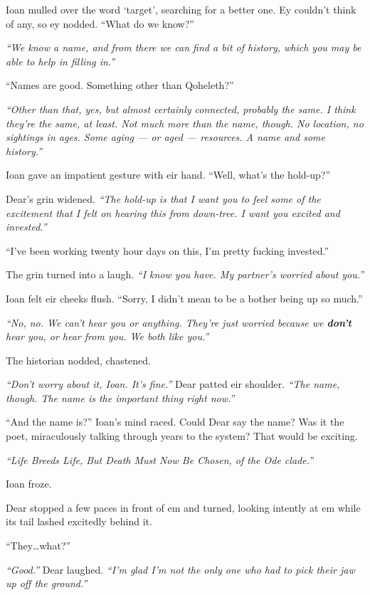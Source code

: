 Ioan mulled over the word `target', searching for a better one. Ey couldn't think of any, so ey nodded. ``What do we know?''

\emph{``We know a name, and from there we can find a bit of history, which you may be able to help in filling in.''}

``Names are good. Something other than Qoheleth?''

\emph{``Other than that, yes, but almost certainly connected, probably the same. I think they're the same, at least. Not much more than the name, though. No location, no sightings in ages. Some aging — or aged — resources. A name and some history.''}

Ioan gave an impatient gesture with eir hand. ``Well, what's the hold-up?''

Dear's grin widened. \emph{``The hold-up is that I want you to feel some of the excitement that I felt on hearing this from down-tree. I want you excited and invested.''}

``I've been working twenty hour days on this, I'm pretty fucking invested.''

The grin turned into a laugh. \emph{``I know you have. My partner's worried about you.''}

Ioan felt eir cheeks flush. ``Sorry, I didn't mean to be a bother being up so much.''

\emph{``No, no. We can't hear you or anything. They're just worried because we \textbf{don't} hear you, or hear from you. We both like you.''}

The historian nodded, chastened.

\emph{``Don't worry about it, Ioan. It's fine.''} Dear patted eir shoulder. \emph{``The name, though. The name is the important thing right now.''}

``And the name is?'' Ioan's mind raced. Could Dear say the name? Was it the poet, miraculously talking through years to the system? That would be exciting.

\emph{``Life Breeds Life, But Death Must Now Be Chosen, of the Ode clade.''}

Ioan froze.

Dear stopped a few paces in front of em and turned, looking intently at em while its tail lashed excitedly behind it.

``They\ldots{}what?''

\emph{``Good.''} Dear laughed. \emph{``I'm glad I'm not the only one who had to pick their jaw up off the ground.''}


